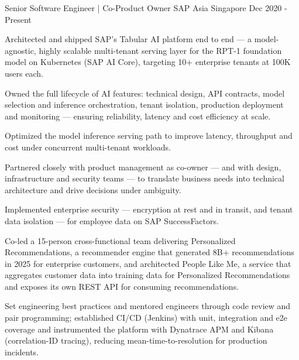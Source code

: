 

\begin{cventries}

  \cventry
    {Senior Software Engineer | Co-Product Owner} %
    {SAP Asia} %
    {Singapore} %
    {Dec 2020 - Present} %
    {
      \begin{cvitems} %
        \item {Architected and shipped SAP's Tabular AI platform end to end --- a model-agnostic, highly scalable multi-tenant serving layer for the RPT-1 foundation model on Kubernetes (SAP AI Core), targeting 10+ enterprise tenants at 100K users each.}
        \item {Owned the full lifecycle of AI features: technical design, API contracts, model selection and inference orchestration, tenant isolation, production deployment and monitoring --- ensuring reliability, latency and cost efficiency at scale.}
        \item {Optimized the model inference serving path to improve latency, throughput and cost under concurrent multi-tenant workloads.}
        \item {Partnered closely with product management as co-owner --- and with design, infrastructure and security teams --- to translate business needs into technical architecture and drive decisions under ambiguity.}
        \item {Implemented enterprise security --- encryption at rest and in transit, and tenant data isolation --- for employee data on SAP SuccessFactors.}
        \item {Co-led a 15-person cross-functional team delivering Personalized Recommendations, a recommender engine that generated 8B+ recommendations in 2025 for enterprise customers, and architected People Like Me, a service that aggregates customer data into training data for Personalized Recommendations and exposes its own REST API for consuming recommendations.}
        \item {Set engineering best practices and mentored engineers through code review and pair programming; established CI/CD (Jenkins) with unit, integration and e2e coverage and instrumented the platform with Dynatrace APM and Kibana (correlation-ID tracing), reducing mean-time-to-resolution for production incidents.}
      \end{cvitems}
    }


\end{cventries}
